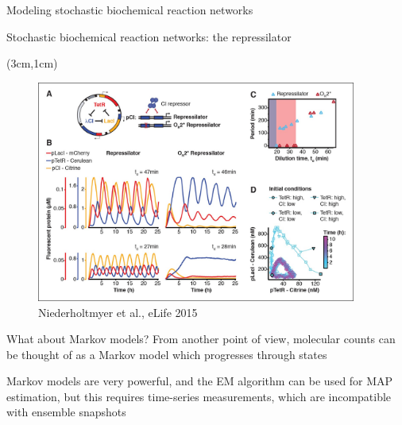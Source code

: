 \documentclass[aspectratio=1610]{beamer}					%
\begin{document}
\begin{section}{Modeling stochastic biochemical reaction networks}

\begin{frame}{Stochastic biochemical reaction networks: the repressilator}
\begin{textblock*}{10.5cm}(3cm,1cm)
\begin{figure}
\includegraphics[width=10.5cm]{repressilator.jpg}
\caption{Niederholtmyer et al., eLife 2015}
\end{figure}
\end{textblock*}
\end{frame}

\begin{frame}{What about Markov models?}
From another point of view, molecular counts can be thought of as a Markov model which progresses through states
\vspace{0.2in}

\begin{center}
\end{center}

Markov models are very powerful, and the EM algorithm can be used for MAP estimation, but this requires time-series measurements, which are incompatible with ensemble snapshots
\end{frame}


\end{section}
\end{document}
